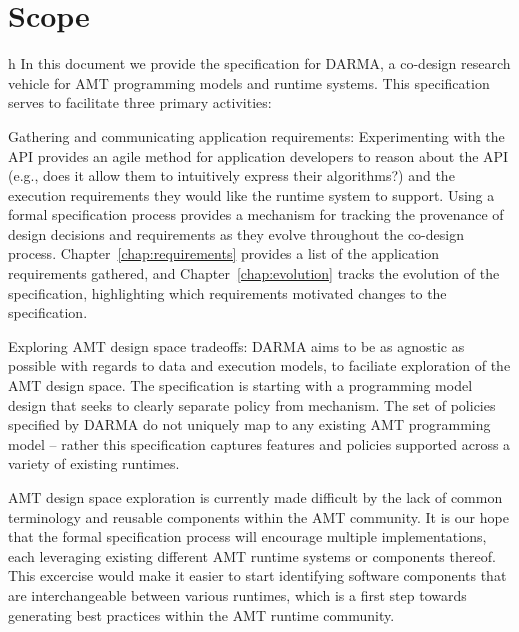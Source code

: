 \section{Scope}h\label{sec:scope}
In this document we provide the specification for DARMA,
a co-design research vehicle for \gls{AMT} programming models and runtime
systems.  This specification serves to facilitate three primary activities: 
\begin{compactdesc}
\item[Gathering and communicating application requirements:]
Experimenting with the \gls{API} provides an agile method for application
developers to reason about the \gls{API} (e.g., does it allow them to intuitively
    express their algorithms?) and the execution requirements they would like
the runtime system to support.
Using a formal specification process provides a mechanism for tracking the
provenance of design decisions and requirements as they evolve throughout the co-design
process. Chapter~\ref{chap:requirements} provides a list of the application
requirements gathered,  and
Chapter~\ref{chap:evolution} tracks the evolution of
the specification, highlighting which requirements
motivated changes to the specification.
\item[Exploring AMT design space tradeoffs:]
DARMA aims to be as agnostic as possible with regards to data and execution
models, to faciliate exploration of the AMT design space. The specification is
starting with a programming model design that seeks to clearly separate policy
from mechanism.  The set of policies specified by DARMA do not uniquely map to any
existing AMT programming model -- rather this specification captures features and policies
supported across a variety of existing runtimes.

\gls{AMT} design space exploration is currently made difficult by the lack of
common terminology and reusable components within the \gls{AMT} community.  It
is our hope that the formal specification process will encourage multiple
implementations, each leveraging
existing different \gls{AMT} runtime systems or components thereof.  
This excercise would make it easier to start identifying 
software components that are interchangeable between various runtimes, which is a first
step towards generating best practices within the \gls{AMT} runtime community.


\end{compactdesc}

